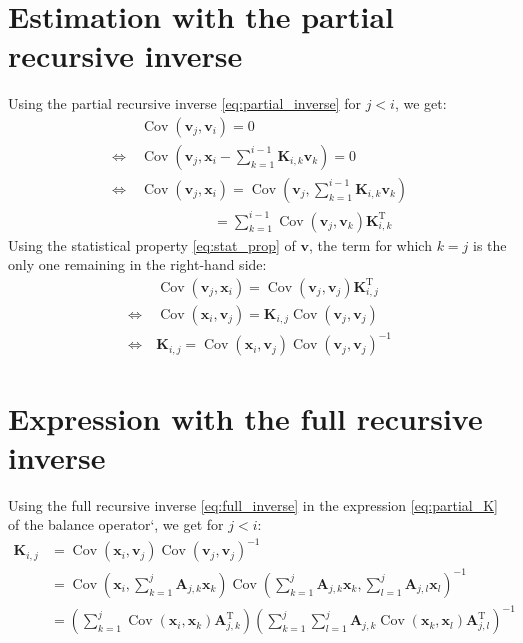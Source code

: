 \documentclass[12pt]{article}
\DeclareMathOperator{\Cov}{Cov}
\begin{document}
\section{Estimation with the partial recursive inverse}
Using the partial recursive inverse \eqref{eq:partial_inverse} for $j < i$, we get:
\begin{align}
&\Cov\left(\mathbf{v}_j,\mathbf{v}_i\right) = 0 \\
\Leftrightarrow \ &\Cov\left(\mathbf{v}_j,\mathbf{x}_i - \sum_{k=1}^{i-1} \mathbf{K}_{i,k} \mathbf{v}_k\right) = 0 \\
\Leftrightarrow \ &\Cov\left(\mathbf{v}_j,\mathbf{x}_i\right) =\Cov\left(\mathbf{v}_j,\sum_{k=1}^{i-1} \mathbf{K}_{i,k} \mathbf{v}_k\right) \\
& \qquad \qquad \quad \ = \sum_{k=1}^{i-1}\Cov\left(\mathbf{v}_j,\mathbf{v}_k\right) \mathbf{K}_{i,k}^\mathrm{T}
\end{align}
Using the statistical property \eqref{eq:stat_prop} of $\mathbf{v}$, the term for which $k=j$ is the only one remaining in the right-hand side:
\begin{align}
\label{eq:partial_K}
&\Cov\left(\mathbf{v}_j,\mathbf{x}_i\right) =\Cov\left(\mathbf{v}_j,\mathbf{v}_j\right) \mathbf{K}_{i,j}^\mathrm{T} \nonumber \\
\Leftrightarrow \ &\Cov\left(\mathbf{x}_i,\mathbf{v}_j\right) = \mathbf{K}_{i,j}\Cov\left(\mathbf{v}_j,\mathbf{v}_j\right) \nonumber \\
\Leftrightarrow \ & \mathbf{K}_{i,j} = \Cov\left(\mathbf{x}_i,\mathbf{v}_j\right)\Cov\left(\mathbf{v}_j,\mathbf{v}_j\right)^{-1}
\end{align}

\section{Expression with the full recursive inverse}
Using the full recursive inverse \eqref{eq:full_inverse} in the expression \eqref{eq:partial_K} of the balance operator`, we get for $j < i$:
\begin{align}
\mathbf{K}_{i,j} & = \Cov\left(\mathbf{x}_i,\mathbf{v}_j\right)\Cov\left(\mathbf{v}_j,\mathbf{v}_j\right)^{-1} \nonumber \\
& = \Cov\left(\mathbf{x}_i,\sum_{k=1}^j \mathbf{A}_{j,k} \mathbf{x}_k\right)\Cov\left(\sum_{k=1}^j \mathbf{A}_{j,k} \mathbf{x}_k,\sum_{l=1}^j \mathbf{A}_{j,l} \mathbf{x}_l\right)^{-1} \nonumber \\
& = \left(\sum_{k=1}^j\Cov\left(\mathbf{x}_i,\mathbf{x}_k\right) \mathbf{A}_{j,k}^\mathrm{T}\right) \left(\sum_{k=1}^j \sum_{l=1}^j\mathbf{A}_{j,k}\Cov\left(\mathbf{x}_k,\mathbf{x}_l\right) \mathbf{A}_{j,l}^\mathrm{T}\right)^{-1} \nonumber \\
\end{align}
\end{document}

